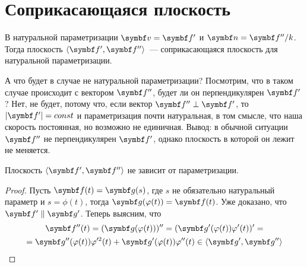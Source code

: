 \documentclass[main]{subfiles}
\begin{document}
\chapter{Соприкасающаяся плоскость}
В натуральной параметризации $\vv = \vf'$ и $\vn = \vf''/k$.
Тогда плоскость $\langle \vf', \vf''\rangle$~--- соприкасающаяся плоскость для натуральной параметризации.

А что будет в случае не натуральной параметризации?
Посмотрим, что в таком случае происходит с вектором $\vf''$, будет ли он перпендикулярен $\vf'$?
Нет, не будет, потому что, если вектор $\vf'' \perp \vf'$, то $|\vf'| = const$
и параметризация почти натуральная, в том смысле, что наша скорость постоянная, но возможно не единичная.
Вывод: в обычной ситуации $\vf''$ не перпендикулярен $\vf'$, однако плоскость в которой он лежит не меняется.

\begin{theorem}
    Плоскость $\langle \vf', \vf''\rangle$ не зависит от параметризации.
\end{theorem}
\begin{proof}
    Пусть $\vf(t) = \vg(s)$, где $s$ не обязательно натуральный параметр и $s = \phi(t)$, тогда $\vg(\phi(t)) = \vf(t)$.
    Уже доказано, что $\vf' \parallel \vg'$.
    Теперь выясним, что
    \begin{multline*}
        \vf''(t) = (\vg(\phi(t)))'' = (\vg'(\phi(t)) \phi'(t))' = \\
        =\vg''(\phi(t)) \phi'^2(t) + \vg'(\phi(t)) \phi''(t) \in \langle \vg', \vg''\rangle
    \end{multline*}
\end{proof}
\end{document}
